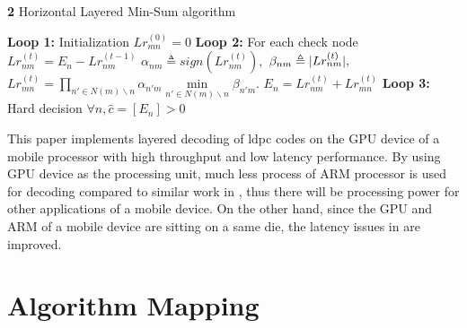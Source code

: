 \documentclass[conference]{IEEEtran}
\DeclarePairedDelimiter\abs{\lvert}{\rvert}%
\begin{document}
\begin{algorithm}
\renewcommand\thealgorithm{}
\caption{\textbf{2} Horizontal Layered Min-Sum algorithm}\label{algorithm2}
\begin{algorithmic}[1]
\STATE \textbf{Loop 1:} Initialization
\STATE
$Lr_{mn}^{(0)}=0$%
\ENDFOR
{}
\STATE \textbf{Loop 2:} For each check node
\STATE$Lr_{nm}^{(t)}=E_n - Lr_{nm}^{(t-1)}$
\ENDFOR
{}
\STATE $\alpha_{nm} \triangleq sign(Lr_{nm}^{(t)}),$
\STATE $\beta_{nm} \triangleq \abs{Lr_{nm}^{(t)}},$
\STATE $Lr_{mn}^{(t)} = \prod\limits_{n' \in N(m)\backslash n} \alpha_{n'm} \min\limits_{n' \in N(m)\backslash n} \beta_{n'm}.$
\ENDFOR
{}
\STATE$E_n = Lr_{nm}^{(t)}+Lr_{mn}^{(t)}$
\ENDFOR
\ENDFOR
\STATE \textbf{Loop 3:} Hard decision
\STATE $\forall n, \hat{c}=[E_n]>0$
\ENDFOR
\ENDFOR %
\end{algorithmic}
\addtocounter{algorithm}{-1}
\end{algorithm}
This paper implements layered decoding of ldpc codes on the GPU device of a mobile processor with high throughput and low latency performance. By using GPU device as the processing unit, much less process of ARM processor is used for decoding compared to similar work in \cite{art_neon}, thus there will be processing power for other applications of a mobile device. On the other hand, since the GPU and ARM of a mobile device are sitting on a same die, the latency issues in \cite{art_gpu_0} are improved.
\section{Algorithm Mapping}\label{sec3}
\end{document}
